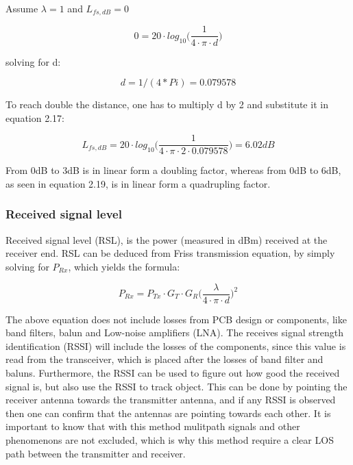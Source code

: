 Assume $\lambda = 1$ and $L_{fs,dB} = 0$

\begin{equation}
    0 = 20 \cdot log_{10}\Big(\frac{1}{4 \cdot \pi \cdot d}\Big)
\end{equation}

solving for d:

\begin{equation}
    d = 1/(4*Pi) = 0.079578
\end{equation}

To reach double the distance, one has to multiply d by 2 and substitute it in equation 2.17:

\begin{equation}
   L_{fs,dB} = 20 \cdot log_{10}\Big(\frac{1}{4 \cdot \pi \cdot 2 \cdot 0.079578}\Big) = 6.02dB 
\end{equation}

From 0dB to 3dB is in linear form a doubling factor, whereas from 0dB to 6dB, as seen in equation 2.19, is in linear form a quadrupling factor.

\subsubsection{Received signal level}
Received signal level (RSL), is the power (measured in dBm) received at the receiver end. RSL can be deduced from Friss transmission equation, by simply solving for $P_{Rx}$, which yields the formula:

\begin{equation}
    P_{Rx} = P_{Tx} \cdot G_T \cdot G_R \Big( \frac{\lambda}{4 \cdot \pi \cdot d} \Big)^2
\end{equation}

The above equation does not include losses from PCB design or components, like band filters, balun and Low-noise amplifiers (LNA). The receives signal strength identification (RSSI) will include the losses of the components, since this value is read from the transceiver, which is placed after the losses of band filter and baluns. Furthermore, the RSSI  can be used to figure out how good the received signal is, but also use the RSSI to track object. This can be done by pointing the receiver antenna towards the transmitter antenna, and if any RSSI is observed then one can confirm that the antennas are pointing towards each other. It is important to know that with this method mulitpath signals and other phenomenons are not excluded, which is why this method require a clear LOS path between the transmitter and receiver. 

